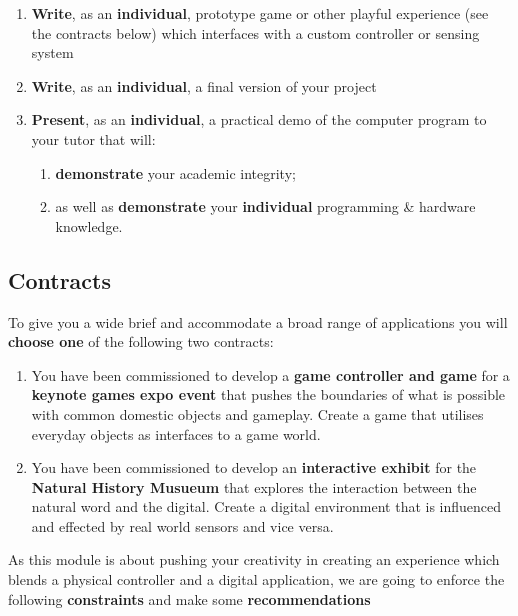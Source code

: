 \documentclass{../../fal_assignment}
\begin{document}
	\begin{enumerate}[label=(\Alph*)]
		\item \textbf{Write}, as an \textbf{individual}, prototype game or other playful experience (see the contracts below) which interfaces with a custom controller or sensing system
		\item \textbf{Write}, as an \textbf{individual}, a final version of your project
		\item \textbf{Present}, as an \textbf{individual}, a practical demo of the computer program to your tutor that will:
		\begin{enumerate}[label=\roman*.]
			\item \textbf{demonstrate} your academic integrity;
			\item as well as \textbf{demonstrate} your \textbf{individual} programming \& hardware knowledge.
		\end{enumerate}
	\end{enumerate}
	\subsection*{Contracts}
	To give you a wide brief and accommodate a broad range of applications you will \textbf{choose one} of the following two contracts:
\begin{enumerate}
	\item You have been commissioned to develop a \textbf{game controller and game} for a \textbf{keynote games expo event} that pushes the boundaries of what is possible with common domestic objects and gameplay. Create a game that utilises everyday objects as interfaces to a game world.
	\item You have been commissioned to develop an \textbf{interactive exhibit} for the \textbf{Natural History Musueum} that explores the interaction between the natural word and the digital. Create a digital environment that is influenced and effected by real world sensors and vice versa.

\end{enumerate}


	As this module is about pushing your creativity in creating an experience which blends a physical controller and a digital application, we are going to enforce the following \textbf{constraints} and make some \textbf{recommendations}	
\end{document}
